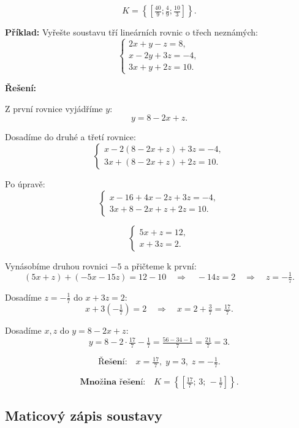 \documentclass[12pt,a4paper]{article}
\begin{document}
\[
K = \left\{\left[\tfrac{40}{9}; \tfrac{4}{9}; \tfrac{10}{3}\right]\right\}.
\]


\begin{examplebox}
\textbf{Příklad:}  
Vyřešte soustavu tří lineárních rovnic o třech neznámých:
\[
\begin{cases}
2x + y - z = 8,\\
x - 2y + 3z = -4,\\
3x + y + 2z = 10.
\end{cases}
\]

\textbf{Řešení:}

Z první rovnice vyjádříme \(y\):
\[
y = 8 - 2x + z.
\]

Dosadíme do druhé a třetí rovnice:
\[
\begin{cases}
x - 2(8 - 2x + z) + 3z = -4,\\
3x + (8 - 2x + z) + 2z = 10.
\end{cases}
\]

Po úpravě:
\[
\begin{cases}
x - 16 + 4x - 2z + 3z = -4,\\
3x + 8 - 2x + z + 2z = 10.
\end{cases}
\]

\[
\begin{cases}
5x + z = 12,\\
x + 3z = 2.
\end{cases}
\]

Vynásobíme druhou rovnici \(-5\) a přičteme k první:
\[
(5x + z) + (-5x - 15z) = 12 - 10 \quad \Rightarrow \quad -14z = 2 \quad \Rightarrow \quad z = -\tfrac{1}{7}.
\]

Dosadíme \(z = -\tfrac{1}{7}\) do \(x + 3z = 2\):
\[
x + 3\left(-\tfrac{1}{7}\right) = 2 \quad \Rightarrow \quad x = 2 + \tfrac{3}{7} = \tfrac{17}{7}.
\]

Dosadíme \(x, z\) do \(y = 8 - 2x + z\):
\[
y = 8 - 2\cdot\tfrac{17}{7} - \tfrac{1}{7} = \tfrac{56 - 34 - 1}{7} = \tfrac{21}{7} = 3.
\]

\[
\textbf{Řešení:} \quad x = \tfrac{17}{7},\; y = 3,\; z = -\tfrac{1}{7}.
\]

\[
\textbf{Množina řešení:} \quad K = \left\{\left[\tfrac{17}{7};\,3;\,-\tfrac{1}{7}\right]\right\}.
\]
\end{examplebox}



\subsection{Maticový zápis soustavy}
\end{document}
